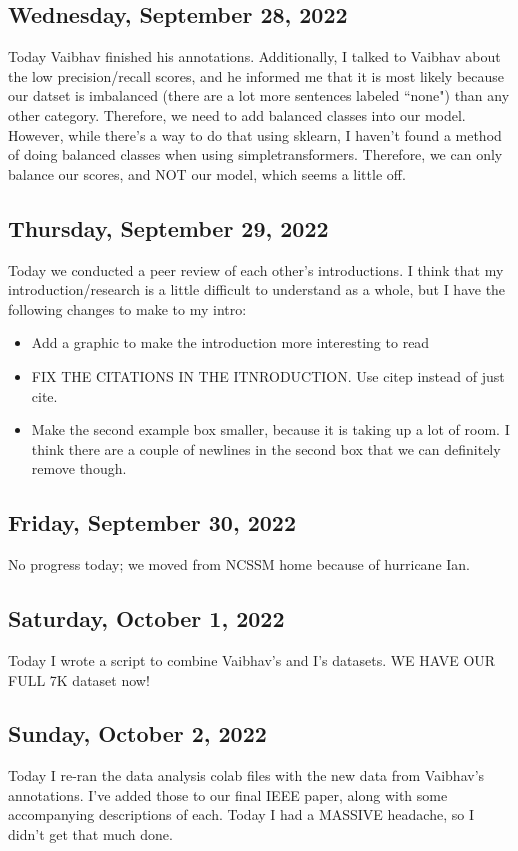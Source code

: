 \documentclass[11pt,letterpaper]{article}
\begin{document}
\subsection{Wednesday, September 28, 2022}
Today Vaibhav finished his annotations. Additionally, I talked to Vaibhav about the low precision/recall scores, and he informed me that it is most likely because our datset is imbalanced (there are a lot more sentences labeled ``none") than any other category. Therefore, we need to add balanced classes into our model. However, while there's a way to do that using sklearn, I haven't found a method of doing balanced classes when using simpletransformers. Therefore, we can only balance our scores, and NOT our model, which seems a little off.

\subsection{Thursday, September 29, 2022}
Today we conducted a peer review of each other's introductions. I think that my introduction/research is a little difficult to understand as a whole, but I have the following changes to make to my intro:

\begin{itemize}
    \item Add a graphic to make the introduction more interesting to read
    \item FIX THE CITATIONS IN THE ITNRODUCTION. Use citep instead of just cite.
    \item Make the second example box smaller, because it is taking up a lot of room. I think there are a couple of newlines in the second box that we can definitely remove though.
\end{itemize}

\subsection{Friday, September 30, 2022}
No progress today; we moved from NCSSM \rightarrow home because of hurricane Ian.

\subsection{Saturday, October 1, 2022}
Today I wrote a script to combine Vaibhav's and I's datasets. WE HAVE OUR FULL 7K dataset now!

\subsection{Sunday, October 2, 2022}
Today I re-ran the data analysis colab files with the new data from Vaibhav's annotations. I've added those to our final IEEE paper, along with some accompanying descriptions of each. Today I had a MASSIVE headache, so I didn't get that much done.
\end{document}
